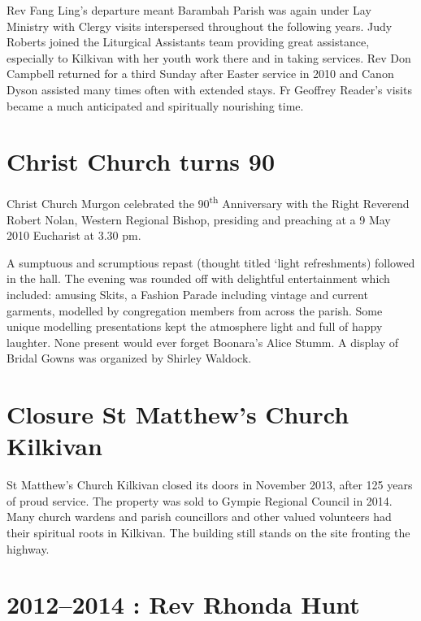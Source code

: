 Rev Fang Ling's departure meant Barambah Parish was again under Lay Ministry with Clergy visits interspersed throughout the following years. Judy Roberts joined the Liturgical Assistants team providing great assistance, especially to Kilkivan with her youth work there and in taking services. Rev Don Campbell returned for a third Sunday after Easter service in 2010 and Canon Dyson assisted many times often with extended stays. Fr Geoffrey Reader's visits became a much anticipated and spiritually nourishing time.



\section{Christ Church turns 90}



Christ Church Murgon celebrated the 90\textsuperscript{th} Anniversary with the Right Reverend Robert Nolan, Western Regional Bishop, presiding and preaching at a 9 May 2010 Eucharist at 3.30 pm.



A sumptuous and scrumptious repast (thought titled `light refreshments) followed in the hall. The evening was rounded off with delightful entertainment which included: amusing Skits, a Fashion Parade including vintage and current garments, modelled by congregation members from across the parish. Some unique modelling presentations kept the atmosphere light and full of happy laughter. None present would ever forget Boonara's Alice Stumm. A display of Bridal Gowns was organized by Shirley Waldock.



\section{Closure St Matthew's Church Kilkivan}



St Matthew's Church Kilkivan closed its doors in November 2013, after 125 years of proud service. The property was sold to Gympie Regional Council in 2014. Many church wardens and parish councillors and other valued volunteers had their spiritual roots in Kilkivan. The building still stands on the site fronting the highway.



\section{2012--2014 : Rev Rhonda Hunt}



